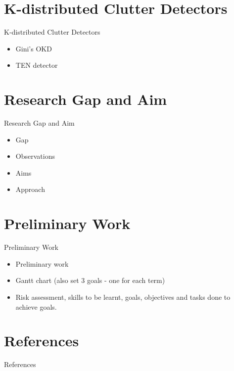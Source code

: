 \documentclass{beamer}
\begin{document}
\section{K-distributed Clutter Detectors}
\begin{frame}{K-distributed Clutter Detectors}
    \begin{itemize}
        \item Gini's OKD
        \item TEN detector
    \end{itemize}
\end{frame}

\section{Research Gap and Aim}
\begin{frame}{Research Gap and Aim}
    \begin{itemize}
        \item Gap
        \item Observations
        \item Aims
        \item Approach
    \end{itemize}
\end{frame}

\section{Preliminary Work}
\begin{frame}{Preliminary Work}
    \begin{itemize}
        \item Preliminary work
        \item Gantt chart (also set 3 goals - one for each term)
        \item Risk assessment, skills to be learnt, goals, objectives and tasks done to achieve goals.
    \end{itemize}
\end{frame}

\section{References}
\begin{frame}{References}
    \printbibliography[heading=none]
\end{frame}
\end{document}
